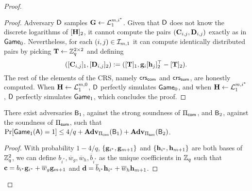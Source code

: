 \begin{proof}
\begin{description}
\begin{proof}
Adversary $\mathsf{D}$ samples
$\mathbf{{G}} \gets \mathcal{L}_1^{m,i^*}$. Given that $\mathsf{D}$ does not know the discrete logarithms of $[\mathbf{{H}}]_2$, it cannot compute the pairs $(\mathbf{{C}}_{i,j},\mathbf{{D}}_{i,j})$ exactly as in $\mathsf{Game}_0$. Nevertheless, for each $(i,j)\in\mathcal{I}_{m,1}$ it can compute identically distributed pairs by picking $\mathbf{{T}}\gets\mathbb{Z}_q^{2\times 2}$ and defining
$$
([\mathbf{{C}}_{i,j}]_1,[\mathbf{{D}}_{i,j}]_2):=([\mathbf{{T}}]_1,\mathbf{g}_i[\mathbf{h}_j]_2^\top-[\mathbf{{T}}]_2).
$$
The rest of the elements of the CRS, namely $\mathsf{crs}_{\mathsf{com}}$ and $\mathsf{crs}_{\mathsf{sum}}$, are honestly computed. When $\mathbf{{H}}\gets\mathcal{L}_1^{m,0}$, $\mathsf{D}$ perfectly simulates $\mathsf{Game}_0$, and when $\mathbf{{H}}\gets\mathcal{L}_1^{m,i^*}$, $\mathsf{D}$ perfectly simulates $\mathsf{Game}_1$, which concludes the proof. 
\end{proof}

\begin{lemma}
There exist adversaries $\mathsf{B}_1$, against the strong soundness of $\Pi_{\mathsf{com}}$, and $\mathsf{B}_2$, against the soundness of $\Pi_{\mathsf{sum}}$, such that $\Pr[\mathsf{Game}_1(\mathsf{A})=1]\leq 4/q+ \mathbf{Adv}_{\Pi_{\mathsf{com}}}(\mathsf{B}_1)+\mathbf{Adv}_{\Pi_{\mathsf{sum}}}(\mathsf{B}_2)$.
\end{lemma}
\begin{proof}
With probability $1-4/q$, $\{\mathbf{g}_{i^*},\mathbf{g}_{m+1}\}$ and $\{\mathbf{h}_{i^*},\mathbf{h}_{m+1}\}$ are both bases of $\mathbb{Z}_q^2$,
we can define $b_{i^*},\overline{w}_g,\overline{w}_h,\overline{b}_{i^*}$ as the unique coefficients in $\mathbb{Z}_q$ such that $\mathbf{c}=b_{i^*}\mathbf{g}_{i^*} + \overline{w}_g \mathbf{g}_{m+1}$ and $\mathbf{d}= \overline{b}_{i^*} \mathbf{h}_{i^*} + \overline{w}_h \mathbf{h}_{m+1}$.


\end{proof}
\end{description}
\end{proof}
